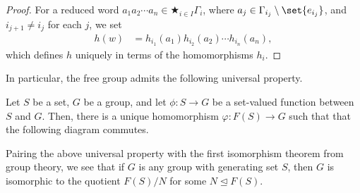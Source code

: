 \begin{proof}
  For a reduced word $a_1a_2\cdots a_n\in \bigstar_{i\in I}\Gamma_i$, where $a_j\in \Gamma_{i_j}\setminus \set{e_{i_j}}$, and $i_{j+1} \neq i_j$ for each $j$, we set
  \begin{align*}
    h\left(w\right) &= h_{i_1}\left(a_1\right)h_{i_2}\left(a_2\right)\cdots h_{i_n}\left(a_n\right),
  \end{align*}
  which defines $h$ uniquely in terms of the homomorphisms $h_{i}$.
\end{proof}
In particular, the free group admits the following universal property.
\begin{definition}
  Let $S$ be a set, $G$ be a group, and let $\phi\colon S\rightarrow G$ be a set-valued function between $S$ and $G$. Then, there is a unique homomorphism $\varphi\colon F(S) \rightarrow G$ such that that the following diagram commutes.
  \begin{center}
  \end{center}
\end{definition}
Pairing the above universal property with the first isomorphism theorem from group theory, we see that if $G$ is any group with generating set $S$, then $G$ is isomorphic to the quotient $F(S) / N$ for some $N\trianglelefteq F(S)$.
%
